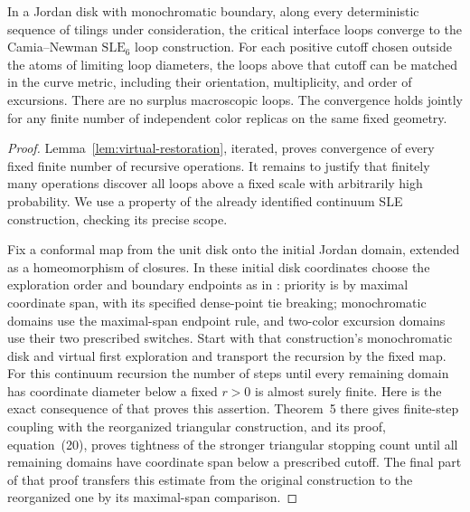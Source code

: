 \begin{proposition}
\label{prop:loops}
In a Jordan disk with monochromatic boundary, along every
deterministic sequence of tilings under consideration, the
critical interface loops converge to the Camia--Newman
$\mathrm{SLE}_6$ loop construction.  For each positive cutoff
chosen outside the atoms of limiting loop diameters, the loops
above that cutoff can be matched in the curve metric, including
their orientation, multiplicity, and order of excursions.
There are no surplus macroscopic loops.  The convergence holds
jointly for any finite number of independent color replicas
on the same fixed geometry.
\end{proposition}

\begin{proof}
Lemma~\ref{lem:virtual-restoration}, iterated, proves convergence
of every fixed finite number of recursive operations.  It
remains to justify that finitely many operations discover all
loops above a fixed scale with arbitrarily high probability.
We use a property of the already identified continuum SLE
construction, checking its precise scope.

Fix a conformal map from the unit disk onto the initial Jordan
domain, extended as a homeomorphism of closures.  In these
initial disk coordinates choose the exploration order and
boundary endpoints as in \cite[Section~3.2]{cnloops}: priority
is by maximal coordinate span, with its specified dense-point
tie breaking; monochromatic domains use the maximal-span
endpoint rule, and two-color excursion domains use their two
prescribed switches.  Start with that construction's
monochromatic disk and virtual first exploration and transport
the recursion by the fixed map.  For this continuum recursion
the number of steps until every remaining domain has
coordinate diameter below a fixed $r>0$ is almost surely
finite.  Here is the exact consequence of \cite{cnloops}
that proves this assertion.  Theorem~5 there gives finite-step
coupling with the reorganized triangular construction, and
its proof, equation~(20), proves tightness of the stronger
triangular stopping count until all remaining domains have
coordinate span below a prescribed cutoff.  The final part
of that proof transfers this estimate from the original
construction to the reorganized one by its maximal-span
comparison.


\end{proof}
